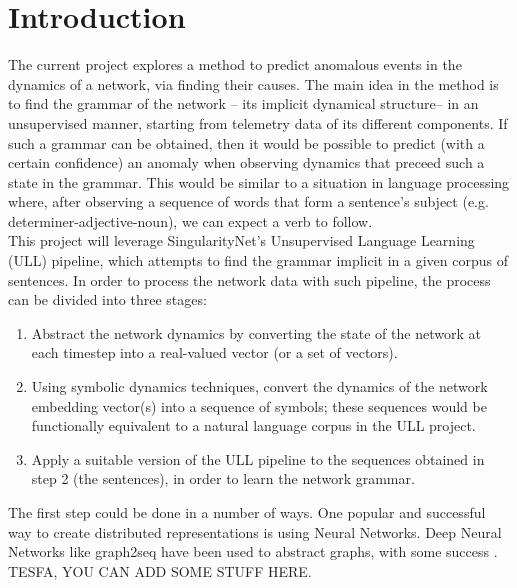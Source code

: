 






\newpage
\section{Introduction}

The current project explores a method to predict anomalous events in the dynamics of a network, via finding their causes.
The main idea in the method is to find the grammar of the network -- its implicit dynamical structure-- in an unsupervised manner, starting from telemetry data of its different components.
If such a grammar can be obtained, then it would be possible to predict (with a certain confidence) an anomaly when observing dynamics that preceed such a state in the grammar.
This would be similar to a situation in language processing where, after observing a sequence of words that form a sentence's subject (e.g. determiner-adjective-noun), we can expect a verb to follow.\\

This project will leverage SingularityNet's Unsupervised Language Learning (ULL) pipeline, which attempts to find the grammar implicit in a given corpus of sentences.
In order to process the network data with such pipeline, the process can be divided into three stages:
\begin{enumerate}
\item Abstract the network dynamics by converting the state of the network at each timestep into a real-valued vector (or a set of vectors).
\item Using symbolic dynamics techniques, convert the dynamics of the network embedding vector(s) into a sequence of symbols; these sequences would be functionally equivalent to a natural language corpus in the ULL project.
\item Apply a suitable version of the ULL pipeline to the sequences obtained in step 2 (the sentences), in order to learn the network grammar.
\end{enumerate}

The first step could be done in a number of ways.
One popular and successful way to create distributed representations is using Neural Networks.
Deep Neural Networks like graph2seq have been used to abstract graphs, with some success 
\cite{venkatakrishnan_graph2seq_2018}.\\
TESFA, YOU CAN ADD SOME STUFF HERE.

